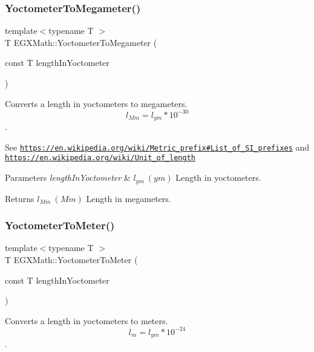 \subsubsection{\texorpdfstring{Yoctometer\+To\+Megameter()}{YoctometerToMegameter()}}
{\footnotesize\ttfamily template$<$typename T $>$ \\
T E\+G\+X\+Math\+::\+Yoctometer\+To\+Megameter (\begin{DoxyParamCaption}\item[{const T}]{length\+In\+Yoctometer }\end{DoxyParamCaption})}



Converts a length in yoctometers to megameters. \[ l_{Mm}=l_{ym} * 10^{-30} \]. 

See \href{https://en.wikipedia.org/wiki/Metric_prefix#List_of_SI_prefixes}{\tt https\+://en.\+wikipedia.\+org/wiki/\+Metric\+\_\+prefix\#\+List\+\_\+of\+\_\+\+S\+I\+\_\+prefixes} and \href{https://en.wikipedia.org/wiki/Unit_of_length}{\tt https\+://en.\+wikipedia.\+org/wiki/\+Unit\+\_\+of\+\_\+length} 
\begin{DoxyParams}{Parameters}
{\em length\+In\+Yoctometer} & $ l_{ym}\ (ym)$ Length in yoctometers. \\
\hline
\end{DoxyParams}
\begin{DoxyReturn}{Returns}
$ l_{Mm}\ (Mm)$ Length in megameters. 
\end{DoxyReturn}
\mbox{\label{group___e_g_x_math-_conversions-_length_conversions-_yoctometer-_s_i_ga35b89591930f45660f7dcdae8660b554}} 
\subsubsection{\texorpdfstring{Yoctometer\+To\+Meter()}{YoctometerToMeter()}}
{\footnotesize\ttfamily template$<$typename T $>$ \\
T E\+G\+X\+Math\+::\+Yoctometer\+To\+Meter (\begin{DoxyParamCaption}\item[{const T}]{length\+In\+Yoctometer }\end{DoxyParamCaption})}



Converts a length in yoctometers to meters. \[ l_{m}=l_{ym} * 10^{-24} \]. 


